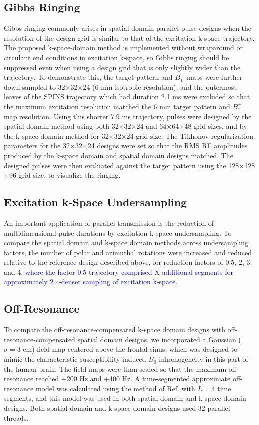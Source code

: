 \subsection*{Gibbs Ringing}
Gibbs ringing commonly arises in spatial domain parallel pulse designs when the resolution of the 
design grid is similar to that of the excitation k-space trajectory. 
The proposed k-space-domain method is implemented without wraparound or circulant end conditions in excitation k-space, 
so Gibbs ringing should be suppressed even when using a design grid that is only slightly wider than the trajectory. 
To demonstrate this, 
the target pattern and $B_1^+$ maps were further down-sampled to 32$\times$32$\times$24 (6 mm isotropic-resolution),
and the outermost leaves of the SPINS trajectory which had duration 2.1 ms were excluded so that the maximum excitation 
resolution matched the 6 mm target pattern and $B_1^+$ map resolution. 
Using this shorter 7.9 ms trajectory, 
pulses were designed by the spatial domain method using both 32$\times$32$\times$24 and 64$\times$64$\times$48 grid sizes,
and by the k-space-domain method for 32$\times$32$\times$24 grid size.
The Tikhonov regularization parameters for the 32$\times$32$\times$24 designs were set so that the RMS RF amplitudes produced 
by the k-space domain and spatial domain designs matched.
The designed pulses were then evaluated against the target pattern using the 128$\times$128$\times$96 grid size,
to visualize the ringing.

\subsection*{Excitation k-Space Undersampling}
An important application of parallel transmission is the reduction of multidimensional pulse durations by excitation k-space undersampling.
To compare the spatial domain and k-space domain methods across undersampling factors,
the number of polar and azimuthal rotations were increased and reduced relative to the reference design described above, 
for reduction factors of 0.5, 2, 3, and 4, 
\textcolor{blue}{where the factor 0.5 trajectory comprised X additional segments for approximately 2$\times$-denser sampling of excitation k-space.} 

\subsection*{Off-Resonance}
To compare the off-resonance-compensated k-space domain designs with off-resonance-compensated spatial domain designs,
we incorporated a Gaussian ($\sigma = 3$ cm) field map centered above the frontal sinus, 
which was designed to mimic the characteristic susceptibility-induced $B_0$ inhomogeneity in this part of the human brain. 
The field maps were than scaled so that the maximum off-resonance reached +200 Hz and +400 Hz.
A time-segmented approximate off-resonance model was calculated using the method of Ref. \cite{fessler2005toeplitz} with $L = 4$ time segments,
and this model was used in both spatial domain and k-space domain designs. 
Both spatial domain and k-space domain designs used 32 parallel threads. 


